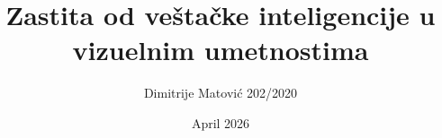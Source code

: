 \documentclass{article}
\title{Zastita od veštačke inteligencije u vizuelnim umetnostima}
\author{Dimitrije Matović 202/2020}
\date{April 2026}
\begin{document}
\maketitle
\newpage

\tableofcontents
\newpage




\newpage

\nocite{*}
\printbibliography
\end{document}
